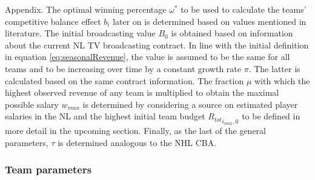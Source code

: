 \documentclass[12pt, a4paper]{article}
\begin{document}
Appendix. The optimal winning percentage $\omega^*$ to be used to calculate the teams' competitive balance effect $b_i$ later on is determined based on values mentioned in literature. The initial broadcasting value $B_0$ is obtained based on information about the current NL TV broadcasting contract. In line with the initial definition in equation \ref{eq:seasonalRevenue}, the value is assumed to be the same for all teams and to be increasing over time by a constant growth rate $\pi$. The latter is calculated based on the same contract information. The fraction $\mu$ with which the highest observed revenue of any team is multiplied to obtain the maximal possible salary $w_{max}$ is determined by considering a source on estimated player salaries in the NL and the highest initial team budget ${R_{tot}}_{i_{max},0}$ to be defined in more detail in the upcoming section. Finally, as the last of the general parameters, $\tau$ is determined analogous to the NHL CBA. 


\subsubsection{Team parameters}
\end{document}
